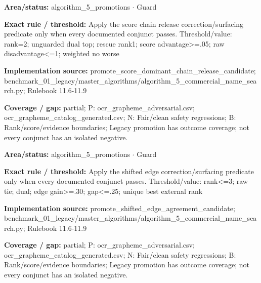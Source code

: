 \begin{tcolorbox}[enhanced,breakable,colback=white,colframe=Muted!45,boxrule=0.45pt,arc=1.5pt,left=6pt,right=6pt,top=5pt,bottom=5pt,title={\texttt{A5-PROMOTE-SCORE-CHAIN-RELEASE}},title after break={\texttt{A5-PROMOTE-SCORE-CHAIN-RELEASE}\ (continued)},fonttitle=\headingfont\bfseries\color{Navy},coltitle=Navy]
\textbf{Area/status:} algorithm\_\allowbreak{}5\_\allowbreak{}promotions $\boldsymbol{\cdot}$ Guard\par
\smallskip
\textbf{Exact rule / threshold:} Apply the score chain release correction/\allowbreak{}surfacing predicate only when every documented conjunct passes. Threshold/\allowbreak{}value: rank=2; unguarded dual top; rescue rank1; score advantage>=.05; raw disadvantage<=1; weighted no worse\par
\smallskip
\textbf{Implementation source:} promote\_\allowbreak{}score\_\allowbreak{}dominant\_\allowbreak{}chain\_\allowbreak{}release\_\allowbreak{}candidate; benchmark\_\allowbreak{}01\_\allowbreak{}legacy/\allowbreak{}master\_\allowbreak{}algorithms/\allowbreak{}algorithm\_\allowbreak{}5\_\allowbreak{}commercial\_\allowbreak{}name\_\allowbreak{}search.py; Rulebook 11.6-11.9\par
\smallskip
\textbf{Coverage / gap:} partial; P: ocr\_\allowbreak{}grapheme\_\allowbreak{}adversarial.csv; ocr\_\allowbreak{}grapheme\_\allowbreak{}catalog\_\allowbreak{}generated.csv; N: Fair/\allowbreak{}clean safety regressions; B: Rank/\allowbreak{}score/\allowbreak{}evidence boundaries; Legacy promotion has outcome coverage; not every conjunct has an isolated negative.
\end{tcolorbox}
\begin{tcolorbox}[enhanced,breakable,colback=white,colframe=Muted!45,boxrule=0.45pt,arc=1.5pt,left=6pt,right=6pt,top=5pt,bottom=5pt,title={\texttt{A5-PROMOTE-SHIFTED-EDGE}},title after break={\texttt{A5-PROMOTE-SHIFTED-EDGE}\ (continued)},fonttitle=\headingfont\bfseries\color{Navy},coltitle=Navy]
\textbf{Area/status:} algorithm\_\allowbreak{}5\_\allowbreak{}promotions $\boldsymbol{\cdot}$ Guard\par
\smallskip
\textbf{Exact rule / threshold:} Apply the shifted edge correction/\allowbreak{}surfacing predicate only when every documented conjunct passes. Threshold/\allowbreak{}value: rank<=3; raw tie; dual; edge gain>=.30; gap<=.25; unique best external rank\par
\smallskip
\textbf{Implementation source:} promote\_\allowbreak{}shifted\_\allowbreak{}edge\_\allowbreak{}agreement\_\allowbreak{}candidate; benchmark\_\allowbreak{}01\_\allowbreak{}legacy/\allowbreak{}master\_\allowbreak{}algorithms/\allowbreak{}algorithm\_\allowbreak{}5\_\allowbreak{}commercial\_\allowbreak{}name\_\allowbreak{}search.py; Rulebook 11.6-11.9\par
\smallskip
\textbf{Coverage / gap:} partial; P: ocr\_\allowbreak{}grapheme\_\allowbreak{}adversarial.csv; ocr\_\allowbreak{}grapheme\_\allowbreak{}catalog\_\allowbreak{}generated.csv; N: Fair/\allowbreak{}clean safety regressions; B: Rank/\allowbreak{}score/\allowbreak{}evidence boundaries; Legacy promotion has outcome coverage; not every conjunct has an isolated negative.
\end{tcolorbox}
